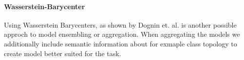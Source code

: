     \paragraph{Wasserstein-Barycenter}
      Using Wasserstein Barycenters, as shown by Dognin et. al. \cite{dognin2019wasserstein} is another possible approch to model ensembling or aggregation. When aggregating the models we additionally include semantic information about for exmaple class topology to create model better suited for the task.
   


    

